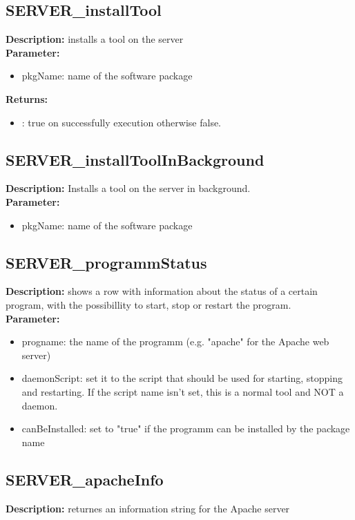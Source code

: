 \subsection{SERVER\_installTool}
\textbf{Description:} installs a tool on the server\\
\textbf{Parameter:}
\begin{itemize}
\item pkgName: name of the software package
\end{itemize}
\textbf{Returns:}
\begin{itemize}
\item : true on successfully execution otherwise false.
\end{itemize}

\subsection{SERVER\_installToolInBackground}
\textbf{Description:} Installs a tool on the server in background.\\
\textbf{Parameter:}
\begin{itemize}
\item pkgName: name of the software package
\end{itemize}

\subsection{SERVER\_programmStatus}
\textbf{Description:} shows a row with information about the status of a certain program, with the possibillity to start, stop or restart the program.\\
\textbf{Parameter:}
\begin{itemize}
\item progname: the name of the programm (e.g. "apache" for the Apache web server)
\item daemonScript: set it to the script that should be used for starting, stopping and restarting. If the script name isn't set, this is a normal tool and NOT a daemon.
\item canBeInstalled: set to "true" if the programm can be installed by the package name
\end{itemize}

\subsection{SERVER\_apacheInfo}
\textbf{Description:} returnes an information string for the Apache server\\

